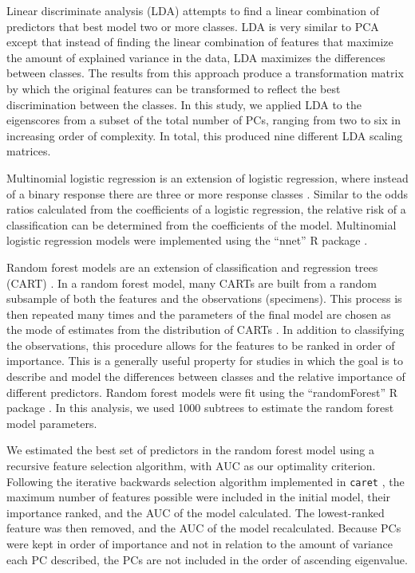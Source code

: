 \documentclass[12pt,letterpaper]{article}
\begin{document}
Linear discriminate analysis (LDA) attempts to find a linear combination of predictors that best model two or more classes. LDA is very similar to PCA except that instead of finding the linear combination of features that maximize the amount of explained variance in the data, LDA maximizes the differences between classes. The results from this approach produce a transformation matrix by which the original features can be transformed to reflect the best discrimination between the classes. In this study, we applied LDA to the eigenscores from a subset of the total number of PCs, ranging from two to six in increasing order of complexity. In total, this produced nine different LDA scaling matrices. 

Multinomial logistic regression is an extension of logistic regression, where instead of a binary response there are three or more response classes \citep{Venables2002a}. Similar to the odds ratios calculated from the coefficients of a logistic regression, the relative risk of a classification can be determined from the coefficients of the model. Multinomial logistic regression models were implemented using the ``nnet'' R package \citep{Venables2002a}.

Random forest models are an extension of classification and regression trees (CART) \citep{Breiman1984,Breiman2001}. In a random forest model, many CARTs are built from a random subsample of both the features and the observations (specimens). This process is then repeated many times and the parameters of the final model are chosen as the mode of estimates from the distribution of CARTs \citep{Breiman2001}. In addition to classifying the observations, this procedure allows for the features to be ranked in order of importance. This is a generally useful property for studies in which the goal is to describe and model the differences between classes and the relative importance of different predictors. Random forest models were fit using the ``randomForest'' R package \citep{Liaw2002}. In this analysis, we used 1000 subtrees to estimate the random forest model parameters. 

We estimated the best set of predictors in the random forest model using a recursive feature selection algorithm, with AUC as our optimality criterion. Following the iterative backwards selection algorithm implemented in \texttt{caret} \citep{KuhnMAN2013}, the maximum number of features possible were included in the initial model, their importance ranked, and the AUC of the model calculated. The lowest-ranked feature was then removed, and the AUC of the model recalculated. Because PCs were kept in order of importance and not in relation to the amount of variance each PC described, the PCs are not included in the order of ascending eigenvalue.
\end{document}
